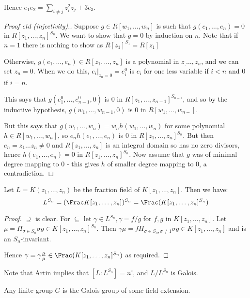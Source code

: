 \documentclass[a4paper, 10pt, twocolumn]{amsart}
\begin{document}
Hence $e_1e_2 = \sum_{i\neq j} z_i^2 z_j + 3 e_3$.
\begin{proof}[Proof ctd (injectivity).]
Suppose $g \in R[w_1, \ldots, w_n]$ is such that $g(e_1, \ldots, e_n) =0$ in $R[z_1, \ldots, z_n]^{S_n}$. We want to show that $g = 0$ by induction on $n$. Note that if $n=1$ there is nothing to show as $R[z_1]^{S_1} = R[z_1]$

Otherwise, $g(e_1, \ldots, e_n) \in R[z_1, \ldots, z_n]$ is a polynomial in $z_, \ldots, z_n$, and we can set $z_n = 0$. When we do this, $e_i|_{z_n = 0} = e_i^0$ is $e_i$ for one less variable if $i<n$ and $0$ if $i = n$.

This says that $g(e_1^0, \ldots, e_{n-1}^0, 0)$ is $0$ in $R[z_1, \ldots, z_{n-1}]^{S_{n-1}}$, and so by the inductive hypothesis, $g(w_1, \ldots, w_{n-1}, 0)$ is 0 in $R[w_1, \ldots, w_{n-}]$.

But this says that $g(w_1, \ldots, w_n) = w_n h(w_1, \ldots, w_n)$ for some polynomial $h \in R[w_1, \ldots, w_n]$, so $e_n h(e_1, \ldots, e_n)$ is $0$ in $R[z_1, \ldots, z_n]^{S_n}$. But then $e_n = z_1 \ldots z_n \neq 0$ and $R[z_1, \ldots, z_n]$ is an integral domain so has no zero divisors, hence $h(e_1, \ldots, e_n) = 0$ in $R[z_1, \ldots, z_n]^{S_n}$. Now assume that $g$ was of minimal degree mapping to 0 - this gives $h$ of smaller degree mapping to 0, a contradiction.
\end{proof}
\begin{lemma}
Let $L = K(z_1, \ldots, z_n)$ be the fraction field of $K[z_1, \ldots, z_n]$. Then we have:
\begin{align*}
L^{S_n} = (\Frac K[z_1, \ldots, z_n])^{S_n} = \Frac (K[z_1, \ldots, z_n]^{S_n})
\end{align*}
\end{lemma}
\begin{proof}
$\supseteq$ is clear. For $\subseteq$ let $\gamma \in L^{S_n}, \gamma=  f/g$ for $f, g$ in $K[z_1, \ldots, z_n]$. Let $\mu  = \Pi_{\sigma \in S_n} \sigma g \in K[z_1, \ldots, z_n]^{S_n}$. Then $\gamma \mu = f \Pi_{\sigma \in S_n, \sigma \neq 1} \sigma g \in K[z_1, \ldots, z_n]$ and is an $S_n$-invariant.

Hence $\gamma=  \gamma \frac{\mu}{\mu} \in \Frac(K[z_1, \ldots, z_n]^{S_n})$ as required.
\end{proof}
Note that Artin implies that $[L:L^{S_n}] = n!$, and $L/L^{S_n}$ is Galois.
\begin{corollary}
Any finite group $G$ is the Galois group of some field extension.
\end{corollary}
\end{document}
